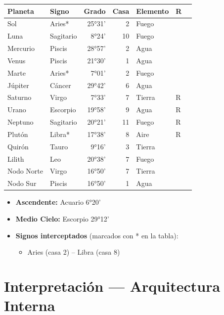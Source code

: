 \documentclass[11pt,a4paper]{article}\usepackage[utf8]{inputenc}
\begin{document}
\begin{center}
\begin{tabular}{llrrlll}
  \toprule
  \textbf{Planeta} & \textbf{Signo} & \textbf{Grado} & \textbf{Casa} &
  \textbf{Elemento} & \textbf{R} \\
  \midrule
  Sol & Aries* & 25°31' & 2 & Fuego &  \\
  Luna & Sagitario & 8°24' & 10 & Fuego &  \\
  Mercurio & Piscis & 28°57' & 2 & Agua &  \\
  Venus & Piscis & 21°30' & 1 & Agua &  \\
  Marte & Aries* & 7°01' & 2 & Fuego &  \\
  Júpiter & Cáncer & 29°42' & 6 & Agua &  \\
  Saturno & Virgo & 7°33' & 7 & Tierra & R \\
  Urano & Escorpio & 19°58' & 9 & Agua & R \\
  Neptuno & Sagitario & 20°21' & 11 & Fuego & R \\
  Plutón & Libra* & 17°38' & 8 & Aire & R \\
  Quirón & Tauro & 9°16' & 3 & Tierra &  \\
  Lilith & Leo & 20°38' & 7 & Fuego &  \\
  Nodo Norte & Virgo & 16°50' & 7 & Tierra &  \\
  Nodo Sur & Piscis & 16°50' & 1 & Agua &  \\
  \bottomrule
\end{tabular}
\end{center}

\vspace{0.5cm}
\begin{itemize}
  \item \textbf{Ascendente:} Acuario 6°20'
  \item \textbf{Medio Cielo:} Escorpio 29°12'
  \item \textbf{Signos interceptados} (marcados con * en la tabla):
  \begin{itemize}
  \item Aries (casa 2) -- Libra (casa 8)
  \end{itemize}
\end{itemize}

\newpage

\section{Interpretación — Arquitectura Interna}
\end{document}

